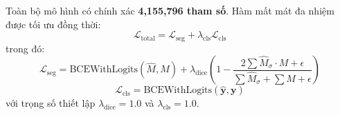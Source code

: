 Toàn bộ mô hình có chính xác \textbf{4,155,796 tham số}. Hàm mất mát đa nhiệm được tối ưu đồng thời:
\begin{equation}
\mathcal{L}_{\text{total}} = \mathcal{L}_{\text{seg}} + \lambda_{\text{cls}} \mathcal{L}_{\text{cls}}
\end{equation}
trong đó:
\begin{equation}
\mathcal{L}_{\text{seg}} = \text{BCEWithLogits}(\hat{M}, M) + \lambda_{\text{dice}} \left( 1 - \frac{2 \sum \hat{M}_{\sigma} \cdot M + \epsilon}{\sum \hat{M}_{\sigma} + \sum M + \epsilon} \right)
\end{equation}
\begin{equation}
\mathcal{L}_{\text{cls}} = \text{BCEWithLogits}(\hat{\mathbf{y}}, \mathbf{y})
\end{equation}
với trọng số thiết lập $\lambda_{\text{dice}} = 1.0$ và $\lambda_{\text{cls}} = 1.0$.
